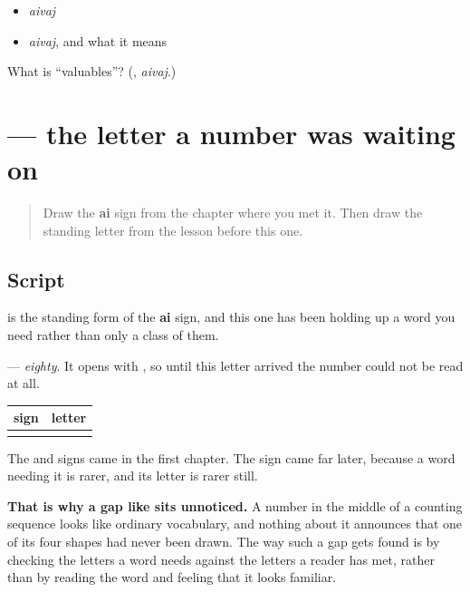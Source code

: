 \begin{itemize}
\raggedright
  \item \emph{aivaj}
  \item \emph{aivaj}, and what it means
\end{itemize}

\begin{tcolorbox}[breakable,colback=teal!4,colframe=teal!35!black,title={Before you move on}]
What is \textquotedblleft{}valuables\textquotedblright{}? (\textbf{}, \emph{aivaj}.)
\end{tcolorbox}
\section[\texorpdfstring{\mr{ऐ} (ai)}{ऐ (ai)}]{ — the letter a number was waiting on}

\label{lesson:MR-W65-ai-independent}



\begin{quote}
Draw the \textbf{ai} sign from the chapter where you met it. Then draw the standing letter from the lesson before this one.
\end{quote}

\subsection*{Script}
\begin{quote}
\end{quote}

\textbf{} is the standing form of the \textbf{ai} sign, and this one has been holding up a word you need rather than only a class of them.

\textbf{} — \emph{eighty}. It opens with \textbf{}, so until this letter arrived the number could not be read at all.

\begin{grammarlens}[title={Grammar Lens: a sign that arrived late, and a letter that arrived later}]
\noindent
\begin{tabularx}{\linewidth}{@{}>{\raggedright\arraybackslash}X>{\raggedright\arraybackslash}X@{}}
\toprule
\textbf{sign} & \textbf{letter} \\
\midrule
\mr{◌ै} & \mr{ऐ} \\
\bottomrule
\end{tabularx}

The \textbf{} and \textbf{} signs came in the first chapter. The \textbf{} sign came far later, because a word needing it is rarer, and its letter is rarer still.

\textbf{That is why a gap like  sits unnoticed.} A number in the middle of a counting sequence looks like ordinary vocabulary, and nothing about it announces that one of its four shapes had never been drawn. The way such a gap gets found is by checking the letters a word needs against the letters a reader has met, rather than by reading the word and feeling that it looks familiar.
\end{grammarlens}

